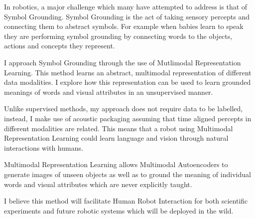 In robotics, a major challenge which many have attempted to address is that of Symbol Grounding. Symbol Grounding is the act of taking sensory percepts and connecting them to abstract symbols. For example when babies learn to speak they are performing symbol grounding by connecting words to the objects, actions and concepts they represent.

I approach Symbol Grounding through the use of Mutlimodal Representation Learning. This method learns an abstract, multimodal representation of different data modalities. I explore how this representation can be used to learn grounded meanings of words and visual attributes in an unsupervised manner.

Unlike supervised methods, my approach does not require data to be labelled, instead, I make use of acoustic packaging assuming that time aligned percepts in different modalities are related. This means that a robot using Multimodal Representation Learning could learn language and vision through natural interactions with humans.


Multimodal Representation Learning allows Multimodal Autoencoders to generate images of unseen objects as well as to ground the meaning of individual words and visual attributes which are never explicitly taught. 

I believe this method will facilitate Human Robot Interaction for both scientific experiments and future robotic systems which will be deployed in the wild.

